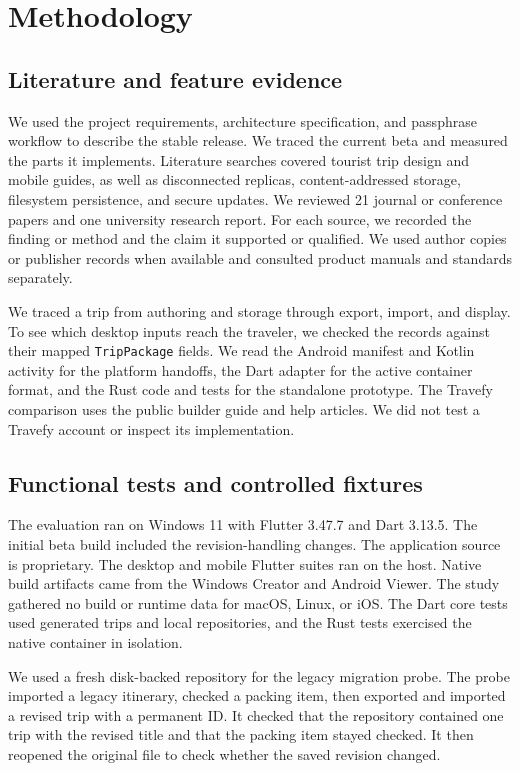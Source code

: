 \section{Methodology}
\label{sec:methodology}

\subsection{Literature and feature evidence}
We used the project requirements, architecture specification, and passphrase workflow to describe the stable release. We traced the current beta and measured the parts it implements. Literature searches covered tourist trip design and mobile guides, as well as disconnected replicas, content-addressed storage, filesystem persistence, and secure updates. We reviewed 21 journal or conference papers and one university research report. For each source, we recorded the finding or method and the claim it supported or qualified. We used author copies or publisher records when available and consulted product manuals and standards separately.

We traced a trip from authoring and storage through export, import, and display. To see which desktop inputs reach the traveler, we checked the records against their mapped \texttt{TripPackage} fields. We read the Android manifest and Kotlin activity for the platform handoffs, the Dart adapter for the active container format, and the Rust code and tests for the standalone prototype. The Travefy comparison uses the public builder guide and help articles. We did not test a Travefy account or inspect its implementation.

\subsection{Functional tests and controlled fixtures}
The evaluation ran on Windows 11 with Flutter 3.47.7 and Dart 3.13.5. The initial beta build included the revision-handling changes. The application source is proprietary. The desktop and mobile Flutter suites ran on the host. Native build artifacts came from the Windows Creator and Android Viewer. The study gathered no build or runtime data for macOS, Linux, or iOS. The Dart core tests used generated trips and local repositories, and the Rust tests exercised the native container in isolation.

We used a fresh disk-backed repository for the legacy migration probe. The probe imported a legacy itinerary, checked a packing item, then exported and imported a revised trip with a permanent ID. It checked that the repository contained one trip with the revised title and that the packing item stayed checked. It then reopened the original file to check whether the saved revision changed.

